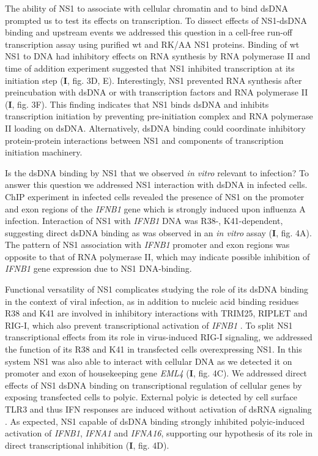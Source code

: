 		The ability of NS1 to associate with cellular chromatin and to bind dsDNA prompted us to test its effects on transcription. To dissect effects of  NS1-dsDNA binding and upstream events we addressed this question in a cell-free run-off transcription assay using purified \gls{wt} and RK/AA NS1 proteins. Binding of wt NS1 to DNA had inhibitory effects on RNA synthesis by RNA polymerase II and time of addition experiment suggested that NS1 inhibited transcription at its initiation step (\textbf{I}, fig. 3D, E). Interestingly, NS1 prevented RNA synthesis after preincubation  with dsDNA or with transcription factors and RNA polymerase II (\textbf{I}, fig. 3F). This finding indicates that NS1 binds dsDNA and inhibits transcription initiation by preventing pre-initiation complex and RNA polymerase II loading on dsDNA. Alternatively, dsDNA binding could coordinate inhibitory protein-protein interactions between NS1 and components of transcription initiation machinery. 
		
		Is the dsDNA binding by NS1 that we observed \textit{in vitro} relevant to infection? To answer this question we addressed NS1 interaction with dsDNA in infected cells. \Gls{ChIP} experiment in infected cells revealed the presence of NS1 on the promoter and exon regions of the \textit{IFNB1} gene which is strongly induced upon influenza A infection. Interaction of NS1 with \textit{IFNB1} DNA was R38-, K41-dependent, suggesting direct dsDNA binding as was observed in an \textit{in vitro} assay (\textbf{I}, fig. 4A). The pattern of NS1 association with \textit{IFNB1} promoter and exon regions was opposite to that of RNA polymerase II, which may indicate possible inhibition of \textit{IFNB1} gene expression due to NS1 DNA-binding. 
		
		Functional versatility of NS1 complicates studying the role of its dsDNA binding in the context of viral infection, as in addition to nucleic acid binding residues R38 and K41 are involved in inhibitory interactions with TRIM25, RIPLET and \gls{RIG-I}, which also prevent transcriptional activation of \textit{IFNB1} \parencite{Gack2009, Rajsbaum2012}. To split NS1 transcriptional effects from its role in virus-induced \gls{RIG-I} signaling, we addressed the function of its R38 and K41 in transfected cells overexpressing NS1. In this system NS1 was also able to interact with cellular DNA as we detected it on promoter and exon of housekeeping gene \textit{EML4} (\textbf{I}, fig. 4C). We addressed direct effects of NS1 dsDNA binding on transcriptional regulation of cellular genes by exposing transfected cells to \gls{polyic}. External \gls{polyic} is detected by cell surface \gls{TLR}3  and thus \gls{IFN} responses are induced without activation of dsRNA signaling \parencite{Karpala2005}. As expected, NS1 capable of dsDNA binding strongly inhibited \gls{polyic}-induced activation of \textit{IFNB1}, \textit{IFNA1} and \textit{IFNA16}, supporting our hypothesis of its role in direct transcriptional inhibition (\textbf{I}, fig. 4D).
		
